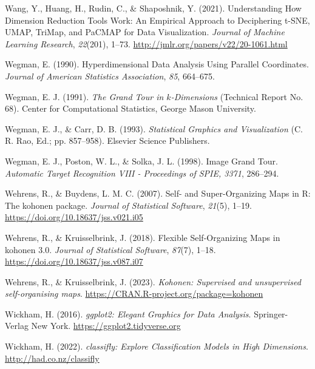 \documentclass[
  letterpaper,
]{krantz}
\newlength{\cslhangindent}
\newenvironment{CSLReferences}[2] %
 {\begin{list}{}{%
  \setlength{\itemindent}{0pt}
  \setlength{\leftmargin}{0pt}
  \setlength{\parsep}{0pt}
  \ifodd #1
   \setlength{\leftmargin}{\cslhangindent}
   \setlength{\itemindent}{-1\cslhangindent}
  \fi
  \setlength{\itemsep}{#2\baselineskip}}}
 {\end{list}}
\begin{document}
\begin{CSLReferences}{1}{0}
Wang, Y., Huang, H., Rudin, C., \& Shaposhnik, Y. (2021). Understanding
{H}ow {D}imension {R}eduction {T}ools {W}ork: An {E}mpirical {A}pproach
to {D}eciphering {t-SNE}, {UMAP}, {TriMap}, and {PaCMAP} for {D}ata
{V}isualization. \emph{Journal of Machine Learning Research},
\emph{22}(201), 1--73. \url{http://jmlr.org/papers/v22/20-1061.html}

Wegman, E. (1990). {H}yperdimensional {D}ata {A}nalysis {U}sing
{P}arallel {C}oordinates. \emph{Journal of American Statistics
Association}, \emph{85}, 664--675.

Wegman, E. J. (1991). \emph{The {G}rand {T}our in \(k\)-{D}imensions}
(Technical Report No. 68). Center for Computational Statistics, George
Mason University.

Wegman, E. J., \& Carr, D. B. (1993). \emph{{S}tatistical {G}raphics and
{V}isualization} (C. R. Rao, Ed.; pp. 857--958). Elsevier Science
Publishers.

Wegman, E. J., Poston, W. L., \& Solka, J. L. (1998). Image {G}rand
{T}our. \emph{Automatic Target Recognition VIII - Proceedings of SPIE,
3371}, 286--294.

Wehrens, R., \& Buydens, L. M. C. (2007). Self- and {S}uper-{O}rganizing
{M}aps in {R}: The {kohonen} package. \emph{Journal of Statistical
Software}, \emph{21}(5), 1--19.
\url{https://doi.org/10.18637/jss.v021.i05}

Wehrens, R., \& Kruisselbrink, J. (2018). Flexible {S}elf-{O}rganizing
{M}aps in {kohonen} 3.0. \emph{Journal of Statistical Software},
\emph{87}(7), 1--18. \url{https://doi.org/10.18637/jss.v087.i07}

Wehrens, R., \& Kruisselbrink, J. (2023). \emph{Kohonen: Supervised and
unsupervised self-organising maps}.
\url{https://CRAN.R-project.org/package=kohonen}

Wickham, H. (2016). \emph{{ggplot2}: {E}legant {G}raphics for {D}ata
{A}nalysis}. Springer-Verlag New York.
\url{https://ggplot2.tidyverse.org}

Wickham, H. (2022). \emph{{classifly}: {E}xplore {C}lassification
{M}odels in {H}igh {D}imensions}. \url{http://had.co.nz/classifly}


\end{CSLReferences}
\end{document}

